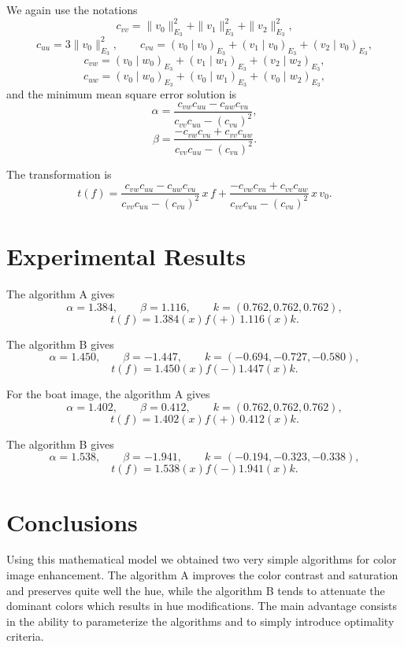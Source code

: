 \documentclass[11pt]{article}
\begin{document}
We again use the notations
\[
c_{vv}=\|v_0\|_{E_3}^2+\|v_1\|_{E_3}^2+\|v_2\|_{E_3}^2,
\]
\[
c_{uu}=3\|v_0\|_{E_3}^2,\qquad
c_{vu}=(v_0\mid v_0)_{E_3}+(v_1\mid v_0)_{E_3}+(v_2\mid v_0)_{E_3},
\]
\[
c_{vw}=(v_0\mid w_0)_{E_3}+(v_1\mid w_1)_{E_3}+(v_2\mid w_2)_{E_3},
\]
\[
c_{uw}=(v_0\mid w_0)_{E_3}+(v_0\mid w_1)_{E_3}+(v_0\mid w_2)_{E_3},
\]
and the minimum mean square error solution is
\begin{equation}
\alpha=\frac{c_{vw}c_{uu}-c_{uw}c_{vu}}{c_{vv}c_{uu}-(c_{vu})^2},
\end{equation}
\begin{equation}
\beta=\frac{-c_{vw}c_{vu}+c_{vv}c_{uw}}{c_{vv}c_{uu}-(c_{vu})^2}.
\end{equation}

The transformation is
\begin{equation}
t(f)=
\frac{c_{vw}c_{uu}-c_{uw}c_{vu}}{c_{vv}c_{uu}-(c_{vu})^2}\,x\,f
+
\frac{-c_{vw}c_{vu}+c_{vv}c_{uw}}{c_{vv}c_{uu}-(c_{vu})^2}\,x\,v_0.
\end{equation}

\section{Experimental Results}

The algorithm A gives
\[
\alpha=1.384,\qquad \beta=1.116,\qquad k=(0.762,0.762,0.762),
\]
\[
t(f)=1.384(x)f(+)\,1.116(x)k.
\]

The algorithm B gives
\[
\alpha=1.450,\qquad \beta=-1.447,\qquad k=(-0.694,-0.727,-0.580),
\]
\[
t(f)=1.450(x)f(-)1.447(x)k.
\]

For the boat image, the algorithm A gives
\[
\alpha=1.402,\qquad \beta=0.412,\qquad k=(0.762,0.762,0.762),
\]
\[
t(f)=1.402(x)f(+)\,0.412(x)k.
\]

The algorithm B gives
\[
\alpha=1.538,\qquad \beta=-1.941,\qquad k=(-0.194,-0.323,-0.338),
\]
\[
t(f)=1.538(x)f(-)1.941(x)k.
\]

\section{Conclusions}

Using this mathematical model we obtained two very simple algorithms for color image enhancement. The algorithm A improves the color contrast and saturation and preserves quite well the hue, while the algorithm B tends to attenuate the dominant colors which results in hue modifications. The main advantage consists in the ability to parameterize the algorithms and to simply introduce optimality criteria.
\end{document}
